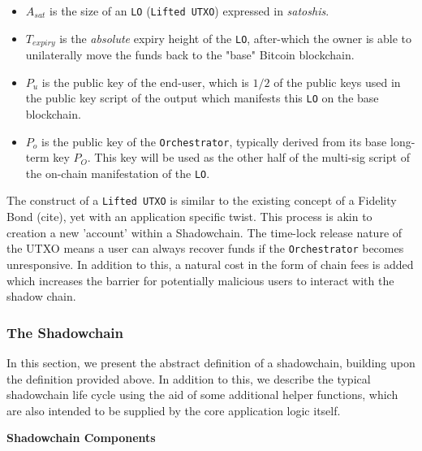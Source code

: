\documentclass[10pt,a4paper]{article}
\theoremstyle{definition}
\begin{document}
\begin{itemize}
    \item $A_{sat}$ is the size of an \texttt{LO} (\texttt{Lifted UTXO})
        expressed in \emph{satoshis}.

    \item $T_{expiry}$ is the \emph{absolute} expiry height of the \texttt{LO},
        after-which the owner is able to unilaterally move the funds back to
        the "base" Bitcoin blockchain.

    \item $P_{u}$ is the public key of the end-user, which is $1/2$ of the
        public keys used in the public key script of the output which manifests
        this \texttt{LO} on the base blockchain.

    \item $P_{o}$ is the public key of the \texttt{Orchestrator}, typically
        derived from its base long-term key $P_O$. This key will be used as the
        other half of the multi-sig script of the on-chain manifestation of the
        \texttt{LO}.
\end{itemize}


The construct of a \texttt{Lifted UTXO} is similar to the existing concept of a
Fidelity Bond (cite), yet with an application specific twist. This process is
akin to creation a new 'account' within a Shadowchain. The time-lock release
nature of the UTXO means a user can always recover funds if the
\texttt{Orchestrator} becomes unresponsive. In addition to this, a natural cost
in the form of chain fees is added which increases the barrier for potentially
malicious users to interact with the shadow chain.

\subsubsection{The Shadowchain}

In this section, we present the abstract definition of a shadowchain, building
upon the definition provided above. In addition to this, we describe the
typical shadowchain life cycle using the aid of some additional helper
functions, which are also intended to be supplied by the core application logic
itself.

\begin{center}
    \textbf{Shadowchain Components}
\end{center}
\end{document}
